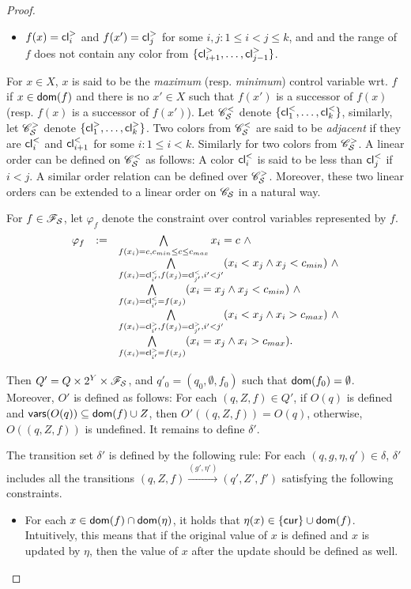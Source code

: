 \begin{appendix}
{\begin{proof}
\begin{itemize}
\item $f(x) = \mathsf{cl}^{>}_i$ and $f(x') = \mathsf{cl}^{>}_{j}$ for some $i,j: 1 \le i < j \le k$, and and the range of $f$ does not contain any color from $\{\mathsf{cl}^{>}_{i+1},\dots, \mathsf{cl}^{>}_{j-1}\}$. 
\end{itemize}
For $x \in X$, $x$ is said to be the \emph{maximum} (resp. \emph{minimum}) control variable wrt. $f$ if $x \in \mathsf{dom}(f)$ and there is no $x' \in X$ such that $f(x')$ is a successor of $f(x)$ (resp. $f(x)$ is a successor of $f(x')$). Let $\mathscr{C}^{<}_{\mathcal{S} }$ denote $\{\mathsf{cl}^{<}_{1},\dots, \mathsf{cl}^{<}_{k}\}$, similarly, let $\mathscr{C}^{>}_{\mathcal{S} }$ denote $\{\mathsf{cl}^{>}_{1},\dots, \mathsf{cl}^{>}_{k}\}$. Two colors from $\mathscr{C}^{<}_{\mathcal{S} }$ are said to be \emph{adjacent} if they are $\mathsf{cl}^{<}_i$ and $\mathsf{cl}^<_{i+1}$ for some $i: 1 \le i < k$. Similarly for two colors from $\mathscr{C}^>_{\mathcal{S} }$. A linear order can be defined on $\mathscr{C}^<_{\mathcal{S} }$ as follows: A color $\mathsf{cl}^<_i$ is said to be less than $\mathsf{cl}^<_j$ if $i<j$. A similar order relation can be defined over $\mathscr{C}^>_{\mathcal{S} }$. Moreover, these two linear orders can be extended to a linear order on $\mathscr{C}_{\mathcal{S} }$ in a natural way.

For $f \in \mathscr{F}_{\mathcal{S} }$, let $\varphi_f$ denote the constraint over control variables represented by $f$.
\[
\begin{array}{l c l }
\varphi_f  &:=& \bigwedge \limits_{f(x_i)=c,  c_{min} \le c \le c_{max}} x_i = c \ \wedge \\
&  & \bigwedge \limits_{f(x_i)=\mathsf{cl}^{<}_{i'}, f(x_j)=\mathsf{cl}^{<}_{j'}, i' < j' } (x_i < x_j \wedge x_j < c_{min})\  \wedge \\
& & \bigwedge \limits_{f(x_i)=\mathsf{cl}^{<}_{i'}= f(x_j)}(x_i = x_j \wedge x_j < c_{min})\ \wedge \\
& & \bigwedge \limits_{f(x_i)=\mathsf{cl}^{>}_{i'}, f(x_j)=\mathsf{cl}^{>}_{j'}, i' < j' } (x_i < x_j \wedge x_i > c_{max})\ \wedge \\
& & \bigwedge \limits_{f(x_i)=\mathsf{cl}^{>}_{i'}= f(x_j)} (x_i = x_j  \wedge x_i > c_{max}).
\end{array}
\]

Then $Q'= Q \times 2^Y \times \mathscr{F}_{\mathcal{S} }$, and $q'_0=(q_0, \emptyset, f_0)$ such that $\mathsf{dom}(f_0)=\emptyset$. Moreover, $O'$ is defined as follows: For each $(q, Z, f) \in Q'$, if $O(q)$  is defined and $\mathsf{vars}(O(q)) \subseteq \mathsf{dom}(f) \cup Z$, then $O'((q, Z, f))=O(q)$, otherwise, $O((q, Z, f))$ is undefined. It remains to define $\delta'$.

The transition set $\delta'$ is defined by the following rule: 
For each $(q, g, \eta, q') \in \delta$, $\delta'$ includes all the transitions $(q, Z, f) \xrightarrow{(g',\eta')} (q', Z', f')$ satisfying the following constraints. 
\begin{itemize}
\item For each $x \in \mathsf{dom}(f) \cap \mathsf{dom}(\eta)$, it holds that $\eta(x) \in \{\mathsf{cur}\} \cup \mathsf{dom}(f)$.  Intuitively, this means that if the original value of $x$ is defined  and $x$ is updated by $\eta$, then the value of $x$ after the update should be defined as well.


\end{itemize}
\end{proof}}
\end{appendix}
